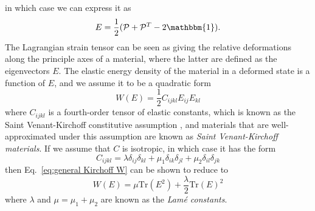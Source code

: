 in which case we can express it as
\begin{equation} \label{eq:approximated E}
E=\frac{1}{2}(\mathcal{P}+\mathcal{P}^{T}-2 \mathbbm{1}).
\end{equation}
The Lagrangian strain tensor can be seen as giving the relative deformations
along the principle axes of a material, where the latter are defined as the eigenvectors $E$. The elastic energy density of the material in a deformed state is a function of $E$, and we assume it to be a quadratic form
\begin{equation} \label{eq:general Kirchoff W}
W(E) = \frac{1}{2} C_{ijkl} E_{ij} E_{kl}
\end{equation}
where $C_{ijkl}$ is a fourth-order tensor of elastic constants, which is known as the Saint Venant-Kirchoff constitutive assumption \cite{basarNonlinearContinuumMechanics2013}, and materials that are well-approximated under this assumption are known as \textit{Saint Venant-Kirchoff materials}. If we assume that $C$ is isotropic, in which case it has the form
\begin{equation}
C_{ijkl} = \lambda \delta_{ij} \delta_{kl} + \mu_1 \delta_{ik} \delta_{jl} + \mu_2 \delta_{il} \delta_{jk}
\end{equation}
then Eq.~\ref{eq:general Kirchoff W} can be shown to reduce to
\begin{equation} \label{eq:elastic energy per volume}
W(E)=\mu\text{Tr}(E^{2})+\frac{\lambda}{2}\text{Tr}(E)^{2}
\end{equation}
where $\lambda$ and $\mu = \mu_1 + \mu_2$ are known as the \textit{Lamé constants}.


